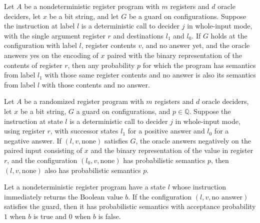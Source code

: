 \begin{lemma}
\label{Complexity.LogProg.PSem.call_pos}
\leanok
{}
Let $A$ be a nondeterministic register program with $m$ registers and $d$ oracle
deciders, let $x$ be a bit string, and let $G$ be a guard on configurations. Suppose the
instruction at label $l$ is a deterministic call to decider $j$ in whole-input mode,
with the single argument register $r$ and destinations $l_1$ and $l_0$. If $G$ holds at
the configuration with label $l$, register contents $v$, and no answer yet, and the
oracle answers yes on the encoding of $x$ paired with the binary representation of the
contents of register $r$, then any probability $p$ for which the program has semantics
from label $l_1$ with those same register contents and no answer is also its semantics
from label $l$ with those contents and no answer.
\end{lemma}

\begin{lemma}
\label{Complexity.LogProg.PSem.call_neg}
\leanok
{}
Let $A$ be a randomized register program with $m$ registers and $d$ oracle deciders, let
$x$ be a bit string, $G$ a guard on configurations, and $p\in\mathbb{Q}$. Suppose the
instruction at state $l$ is a deterministic call to decider $j$ in whole-input mode,
using register $r$, with successor states $l_1$ for a positive answer and $l_0$ for a
negative answer. If $(l,v,\mathrm{none})$ satisfies $G$, the oracle answers negatively
on the paired input consisting of $x$ and the binary representation of the value in
register $r$, and the configuration $(l_0,v,\mathrm{none})$ has probabilistic semantics
$p$, then $(l,v,\mathrm{none})$ also has probabilistic semantics $p$.
\end{lemma}

\begin{lemma}
\label{Complexity.LogProg.PSem.ret}
\leanok
{}
Let a nondeterministic register program have a state $l$ whose instruction immediately
returns the Boolean value $b$. If the configuration $(l,v,\text{no answer})$ satisfies
the guard, then it has probabilistic semantics with acceptance probability $1$ when $b$
is true and $0$ when $b$ is false.
\end{lemma}

